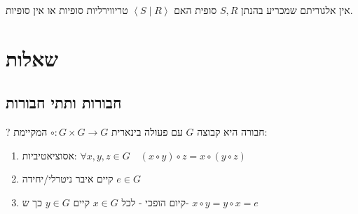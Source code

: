 \documentclass{tstextbook}
\begin{document}
\begin{remark}
אין אלגוריתם שמכריע בהנתן \(S,R\) סופית האם \(\left\langle  S\mid R  \right\rangle\) טריווירליות סופיות או אין סופיות.

\end{remark}
\chapter{שאלות}

\section{חבורות ותתי חבורות}

?
חבורה היא קבוצה \(G\) עם פעולה בינארית \(\circ:G\times G\to G\)  המקיימת:

\begin{enumerate}
  \item אסוציאטיביות: \(\forall x,y,z\in G\quad(x\circ y)\circ z=x\circ(y\circ z)\)


  \item קיים איבר ניטרלי/יחידה \(e\in G\)


  \item קיום הופכי - לכל \(x \in G\) קיים \(y\in G\) כך ש- \(x\circ y=y\circ x=e\)


\end{enumerate}
\end{document}
